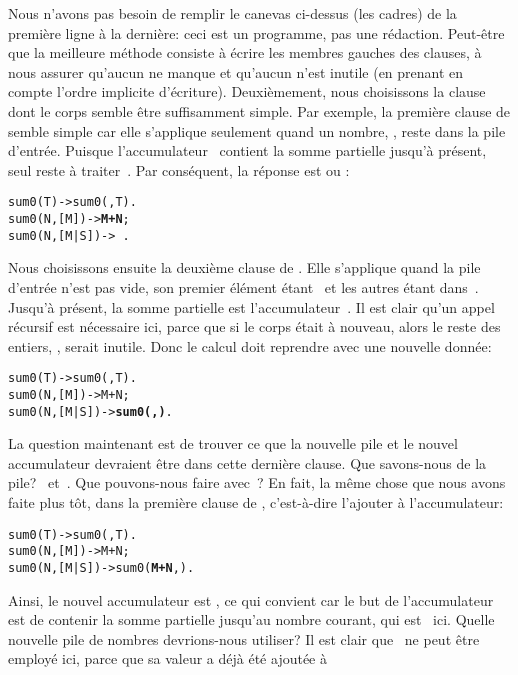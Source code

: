 Nous n'avons pas besoin de remplir le canevas ci-dessus (les cadres)
de la première ligne à la dernière: ceci est un programme, pas une
rédaction. Peut-être que la meilleure méthode consiste à écrire les
membres gauches des clauses, à nous assurer qu'aucun ne manque et
qu'aucun n'est inutile (en prenant en compte l'ordre implicite
d'écriture). Deuxièmement, nous choisissons la clause dont le corps
semble être suffisamment simple. Par exemple, la première clause de
 semble simple car elle s'applique seulement quand un
nombre, , reste dans la pile d'entrée. Puisque
l'accumulateur~ contient la somme partielle jusqu'à
présent, seul reste à traiter~. Par conséquent, la réponse
est  ou :
\begin{alltt}
sum0(T)       -> sum0(,T).
sum0(N,[M])   -> \textbf{M+N};
sum0(N,[M|S]) -> \,.
\end{alltt}
Nous choisissons ensuite la deuxième clause de . Elle
s'applique quand la pile d'entrée n'est pas vide, son premier élément
étant~ et les autres étant dans~. Jusqu'à
présent, la somme partielle est l'accumulateur~. Il est
clair qu'un appel récursif est nécessaire ici, parce que si le corps
était  à nouveau, alors le reste des entiers,
, serait inutile. Donc le calcul doit reprendre avec une
nouvelle donnée:
\begin{alltt}
sum0(T)       -> sum0(,T).
sum0(N,[M])   -> M+N;
sum0(N,[M|S]) -> \textbf{sum0(}\textbf{,}\textbf{)}.
\end{alltt}
La question maintenant est de trouver ce que la nouvelle pile et le
nouvel accumulateur devraient être dans cette dernière clause. Que
savons-nous de la pile?  ~et~. Que pouvons-nous
faire avec~? En fait, la même chose que nous avons faite
plus tôt, dans la première clause de , c'est-à-dire
l'ajouter à l'accumulateur:
\begin{alltt}
sum0(T)       -> sum0(,T).
sum0(N,[M])   -> M+N;
sum0(N,[M|S]) -> sum0(\textbf{M+N},).
\end{alltt}
Ainsi, le nouvel accumulateur est , ce qui convient car
le but de l'accumulateur est de contenir la somme partielle jusqu'au
nombre courant, qui est~ ici. Quelle nouvelle pile de
nombres devrions-nous utiliser? Il est clair que~ ne peut
être employé ici, parce que sa valeur a déjà été ajoutée à
